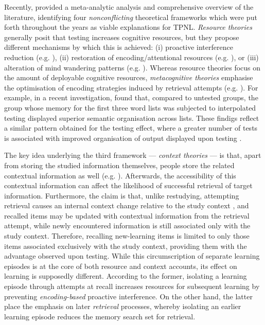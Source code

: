 \documentclass[../main.tex]{subfiles}
\begin{document}
Recently, \cite{chanRetrievalPotentiatesNew2018} provided a meta-analytic 
analysis and comprehensive overview of the literature, identifying four 
\textit{nonconflicting} theoretical frameworks which were put forth throughout 
the years as viable explanations for TPNL. \textit{Resource theories} generally 
posit that testing increases cognitive resources, but they propose different 
mechanisms by which this is achieved: (i) proactive interference reduction 
(e.g. \citealp{wahlheimTestingCanCounteract2015, 
weinsteinTestingProtectsProactive2011, szpunarTestingStudyInsulates2008, 
nunesTestingImprovesTrue2012}), (ii) restoration of encoding/attentional 
resources (e.g. \citealp{pastotterRetrievalLearningFacilitates2011}), or (iii) 
alteration of mind wandering patterns (e.g. 
\citealp{jingInterpolatedTestingInfluences2016,szpunarInterpolatedMemoryTests2013,szpunarMindWanderingEducation2013}).
 Whereas resource theories focus on the amount of deployable cognitive 
resources, \textit{metacognitive theories} emphasise the optimisation of 
encoding strategies induced by retrieval attempts (e.g. 
\citealp{choTestingEnhancesBoth2017, chanTestingPotentiatesNew2018}). For 
example, in a recent investigation, \cite{chanTestingPotentiatesNew2018} found 
that, compared to untested groups, the group whose memory for the first three 
word lists was subjected to interpolated testing displayed superior semantic 
organisation across lists. These findigs reflect a similar pattern obtained for 
the testing effect, where a greater number of tests is associated with improved 
organisation of output displayed upon testing 
\citep{karpickeRetrievalBasedLearningActive2012,zarombTestingEffectFree2010}.

The key idea underlying the third framework --- \textit{context theories} --- 
is that, apart from storing the studied information themselves, people store 
the related contextual information as well (e.g. 
\citealp{lehmanEpisodicContextAccount2014}). Afterwards, the accessibility of 
this contextual information can affect the likelihood of successful retrieval 
of target information. Furthermore, the claim is that, unlike restudying, 
attempting retrieval causes an internal context change relative to the study 
context \citep{jangContextRetrievalContext2008, 
sahakyanContextualChangeAccount2002}, and recalled items may be updated with 
contextual information from the retrieval attempt, while newly encountered 
information is still associated only with the study context. Therefore, 
recalling new-learning items is limited to only those items associated 
exclusively with the study context, providing them with the advantage observed 
upon testing. While this circumscription of separate learning episodes is at 
the core of both resource and context accounts, its effect on learning is 
supposedly different. According to the former, isolating a learning episode 
through attempts at recall increases resources for subsequent learning by 
preventing \textit{encoding-based} proactive interference. On the other hand, 
the latter place the emphasis on later \textit{retrieval} processes, whereby 
isolating an earlier learning episode reduces the memory search set for 
retrieval.
\end{document}
